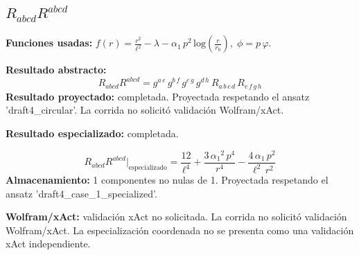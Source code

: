 \documentclass[11pt]{article}
\begin{document}
\subsection*{$ R_{abcd}R^{abcd} $}
\textbf{Funciones usadas:} $ f\!\left(r\right) = \frac{{r}^{2}}{{\ell}^{2}} - \lambda - \alpha_{1}\,{p}^{2}\,\mathrm{log}\!\left(\frac{r}{r_{0}}\right),\;\phi=p\,\varphi $.\par
\textbf{Resultado abstracto:}
\begin{dmath*}[breakdepth={5}]
R_{abcd}R^{abcd} = g{}^{a\,e}\,g{}^{b\,f}\,g{}^{c\,g}\,g{}^{d\,h}\,R{}_{a\,b\,c\,d}\,R{}_{e\,f\,g\,h}
\end{dmath*}
\textbf{Resultado proyectado:} completada. Proyectada respetando el ansatz 'draft4\_circular'. La corrida no solicitó validación Wolfram/xAct.\par
\textbf{Resultado especializado:} completada.\par
\begin{dmath*}[breakdepth={5}]
R_{abcd}R^{abcd}\big|_{\mathrm{especializado}} = \frac{12}{{\ell}^{4}} + \frac{3\,{\alpha_{1}}^{2}\,{p}^{4}}{{r}^{4}} - \frac{4\,\alpha_{1}\,{p}^{2}}{{\ell}^{2}\,{r}^{2}}
\end{dmath*}
\textbf{Almacenamiento:} 1 componentes no nulas de 1. Proyectada respetando el ansatz 'draft4\_case\_1\_specialized'.\par
\textbf{Wolfram/xAct:} validación xAct no solicitada. La corrida no solicitó validación Wolfram/xAct. La especialización coordenada no se presenta como una validación xAct independiente.\par\medskip
{}
\end{document}
